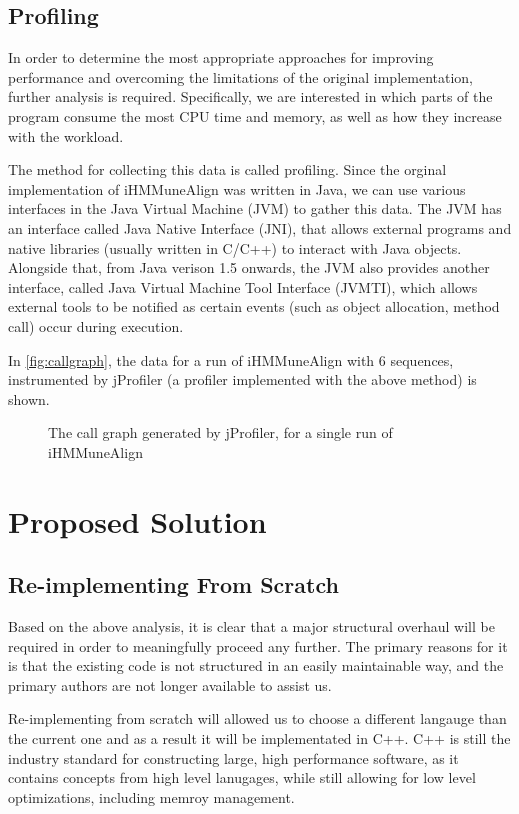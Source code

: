 \documentclass[a4paper,12pt]{report}
\begin{document}
\section{Profiling}
In order to determine the most appropriate approaches for improving performance and overcoming the limitations of the original implementation, further analysis is required. Specifically, we are interested in which parts of the program consume the most CPU time and memory, as well as how they increase with the workload.

The method for collecting this data is called profiling. Since the orginal implementation of iHMMuneAlign was written in Java, we can use various interfaces in the Java Virtual Machine (JVM) to gather this data. The JVM has an interface called Java Native Interface (JNI)\autocite{jni}, that allows external programs and native libraries (usually written in C/C++) to interact with Java objects. Alongside that, from Java verison 1.5 onwards, the JVM also provides another interface, called Java Virtual Machine Tool Interface (JVMTI)\autocite{jvmti}, which allows external tools to be notified as certain events (such as object allocation, method call) occur during execution.

In \autoref{fig:callgraph}, the data for a run of iHMMuneAlign with 6 sequences, instrumented by jProfiler (a profiler implemented with the above method) is shown.

\begin{figure}
 \caption{The call graph generated by jProfiler, for a single run of iHMMuneAlign}
 \label{fig:callgraph}
\end{figure}


\chapter{Proposed Solution}

\section{Re-implementing From Scratch}
Based on the above analysis, it is clear that a major structural overhaul will be required in order to meaningfully proceed any further. The primary reasons for it is that the existing code is not structured in an easily maintainable way, and the primary authors are not longer available to assist us. 

Re-implementing from scratch will allowed us to choose a different langauge than the current one and as a result it will be implementated in C++. C++ is still the industry standard for constructing large, high performance software\autocite{cpp}, as it contains concepts from high level lanugages, while still allowing for low level optimizations, including memroy management. 
\end{document}
